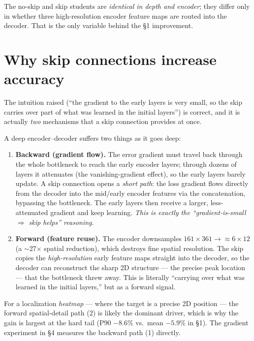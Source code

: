 \documentclass[11pt]{article}
\begin{document}
\noindent The no-skip and skip students are \emph{identical in depth and encoder};
they differ only in whether three high-resolution encoder feature maps are routed
into the decoder. That is the only variable behind the \S1 improvement.

\section{Why skip connections increase accuracy}

The intuition raised (``the gradient to the early layers is very small, so the
skip carries over part of what was learned in the initial layers'') is correct,
and it is actually \emph{two} mechanisms that a skip connection provides at once.

A deep encoder--decoder suffers two things as it goes deep:
\begin{enumerate}
\item \textbf{Backward (gradient flow).} The error gradient must travel back
through the whole bottleneck to reach the early encoder layers; through dozens of
layers it attenuates (the vanishing-gradient effect), so the early layers barely
update. A skip connection opens a \emph{short path}: the loss gradient flows
directly from the decoder into the mid/early encoder features via the
concatenation, bypassing the bottleneck. The early layers then receive a larger,
less-attenuated gradient and keep learning. \emph{This is exactly the
``gradient-is-small $\Rightarrow$ skip helps'' reasoning.}
\item \textbf{Forward (feature reuse).} The encoder downsamples
$161\times361 \to \approx 6\times12$ (a $\sim$27$\times$ spatial reduction), which
destroys fine spatial resolution. The skip copies the \emph{high-resolution}
early feature maps straight into the decoder, so the decoder can reconstruct the
sharp 2D structure --- the precise peak location --- that the bottleneck threw
away. This is literally ``carrying over what was learned in the initial layers,''
but as a forward signal.
\end{enumerate}

For a localization \emph{heatmap} --- where the target is a precise 2D position
--- the forward spatial-detail path (2) is likely the dominant driver, which is
why the gain is largest at the hard tail (P90 $-8.6\%$ vs.\ mean $-5.9\%$ in
\S1). The gradient experiment in \S4 measures the backward path (1) directly.
\end{document}
